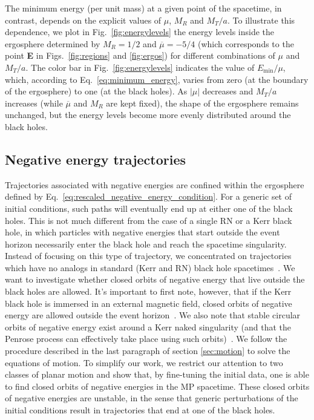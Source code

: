 The minimum energy (per unit mass) at a given point of the spacetime, in contrast, depends on the explicit values of $\mu$, $M_R$ and $M_T/a$. To illustrate this dependence, we plot in Fig.~\ref{fig:energylevels} the energy levels inside the ergosphere determined by $M_R=1/2$ and $\overline \mu = -5/4$ (which corresponds to the point \textbf{E} in Figs.~\ref{fig:regions} and \ref{fig:ergos}) for different combinations of $\mu$ and $M_T/a$. The color bar in Fig.~\ref{fig:energylevels} indicates the value of $E_{\mathrm{min}}/\mu$, which, according to Eq.~\eqref{eq:minimum_energy}, varies from zero (at the boundary of the ergosphere) to one (at the black holes). As $|\mu|$ decreases and $M_T/a$ increases (while $\overline \mu$ and $M_R$ are kept fixed), the shape of the ergosphere remains unchanged, but the energy levels become more evenly distributed around the black holes.

\subsection{Negative energy trajectories}
\label{sec:neg_energy}

Trajectories associated with negative energies are confined within the ergosphere defined by Eq.~\eqref{eq:rescaled_negative_energy_condition}. For a generic set of initial conditions, such paths will eventually end up at either one of the black holes. This is not much different from the case of a single RN or a Kerr black hole, in which particles with negative energies that start outside the event horizon necessarily enter the black hole and reach the spacetime singularity. Instead of focusing on this type of trajectory, we concentrated on trajectories which have no analogs in standard (Kerr and RN) black hole spacetimes~\cite{Grib:2013hxa,Zaslavskii:2020crn}. We want to investigate whether closed orbits of negative energy that live outside the black holes are allowed. It's important to first note, however, that if the Kerr black hole is immersed in an external magnetic field, closed orbits of negative energy are allowed outside the event horizon~\cite{PRASANA1982,FELICE2004}. We also note that stable circular orbits of negative energy exist around a Kerr naked singularity (and that the Penrose process can effectively take place using such orbits)~\cite{STUCHLIK1980}. We follow the procedure described in the last paragraph of section \ref{sec:motion} to solve the equations of motion. To simplify our work, we restrict our attention to two classes of planar motion and show that, by fine-tuning the initial data, one is able to find closed orbits of negative energies in the MP spacetime. These closed orbits of negative energies are unstable, in the sense that generic perturbations of the initial conditions result in trajectories that end at one of the black holes.

